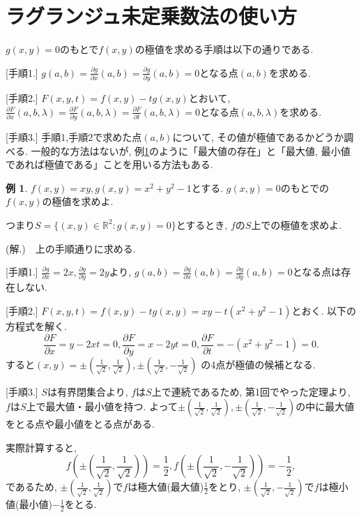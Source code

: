\documentclass[dvipdfmx,a4paper,11pt]{article}
\newcommand{\R}{\mathbb{R}}
\theoremstyle{definition}
\newtheorem{exa}[thm]{例}
\newcommand{\pdrv}[2]{\frac{\partial #1}{\partial #2}}
\begin{document}
\section{ラグランジュ未定乗数法の使い方}  
 \begin{tcolorbox}[
    colback = white,
    colframe = green!35!black,
    fonttitle = \bfseries,
    breakable = true]

 $g(x,y)=0$のもとで$f(x,y)$の極値を求める手順は以下の通りである.
 
 \begin{description}


 \item{[手順1.]} $g(a,b)=\pdrv{g}{x}(a,b)=\pdrv{g}{y}(a,b)=0$となる点$(a,b)$を求める.
 
   \item{[手順2.]} $F(x,y,t) = f(x,y)-tg(x,y)$とおいて, 
   $\pdrv{F}{x}(a,b,\lambda) = \pdrv{F}{y}(a,b,\lambda) = \pdrv{F}{t}(a,b,\lambda)=0$となる点$(a,b,\lambda)$を求める. %
   
 \item{[手順3.]} 手順1,手順2で求めた点$(a,b)$について, その値が極値であるかどうか調べる.
一般的な方法はないが, 例\ref{lan_exa}のように「最大値の存在」と「最大値, 最小値であれば極値である」ことを用いる方法もある.
 \end{description}

    \end{tcolorbox}
    
\begin{exa}
\label{lan_exa}
$f(x,y) = xy, g(x,y) = x^2+y^2-1$とする.
$g(x,y) =0$のもとでの$f(x,y)$の極値を求めよ.

つまり$S = \{ (x,y) \in \R^2: g(x,y)=0\}$とするとき, $f$の$S$上での極値を求めよ.

(解.)　上の手順通りに求める.

 [手順1.]
 $\pdrv{g}{x}=2x, \pdrv{g}{y}=2y$より, $g(a,b)=\pdrv{g}{x}(a,b)=\pdrv{g}{y}(a,b)=0$となる点は存在しない.
 
[手順2.] $F(x,y,t) = f(x,y)-tg(x,y) = xy - t(x^2 + y^2 -1)$とおく.
以下の方程式を解く.
$$
\pdrv{F}{x} = y-2xt=0,
\pdrv{F}{y}= x-2yt=0,
\pdrv{F}{t} =-(x^2+y^2-1)=0.
$$
すると$(x,y) =\pm \left(\frac{1}{\sqrt{2}},\frac{1}{\sqrt{2}}\right) , \pm \left(\frac{1}{\sqrt{2}},-\frac{1}{\sqrt{2}}\right)$
の4点が極値の候補となる.

[手順3.] $S $は有界閉集合より, $f$は$S$上で連続であるため, 第1回でやった定理より, 
$f$は$S$上で最大値・最小値を持つ.
よって$\pm \left(\frac{1}{\sqrt{2}},\frac{1}{\sqrt{2}}\right) , \pm \left(\frac{1}{\sqrt{2}},-\frac{1}{\sqrt{2}}\right)$の中に最大値をとる点や最小値をとる点がある.

実際計算すると, 
$$
f\left(\pm \left(\frac{1}{\sqrt{2}},\frac{1}{\sqrt{2}}\right)\right)=\frac{1}{2}, 
f\left(\pm \left(\frac{1}{\sqrt{2}},-\frac{1}{\sqrt{2}}\right)\right)=-\frac{1}{2}, 
$$
であるため, $\pm \left(\frac{1}{\sqrt{2}},\frac{1}{\sqrt{2}}\right) $で$f$は極大値(最大値)$\frac{1}{2}$をとり, 
$\pm \left(\frac{1}{\sqrt{2}},-\frac{1}{\sqrt{2}}\right)$で$f$は極小値(最小値)$-\frac{1}{2}$をとる.

\end{exa}
\end{document}
